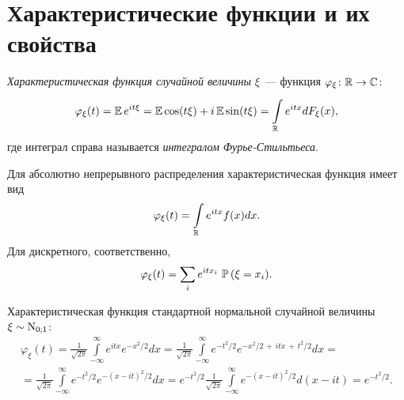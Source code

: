 \section{Характеристические функции и их свойства}
\begin{defn}
    \textit{Характеристическая функция случайной величины} $\xi$~--- функция $\varphi_{\xi} \colon \mathbb{R} \to \mathbb{C}$:
    \begin{equation*}
        \varphi_{\xi}(t)
        = \operatorname{\mathbb{E}} e^{it \xi}
        = \operatorname{\mathbb{E}} \cos (t \xi)+i \operatorname{\mathbb{E}} \sin (t \xi) = \int\limits_{\mathbb{R}}^{} e^{i t x} d F_{\xi}(x),
    \end{equation*}
    где интеграл справа называется \textit{интегралом Фурье-Стильтьеса}.
    
    Для абсолютно непрерывного распределения характеристическая функция имеет вид
    \begin{equation*}
        \varphi_{\xi}(t)=\int\limits_{\mathbb{R}} e^{i t x} f(x) dx.
    \end{equation*}
    Для дискретного, соответственно,
    \begin{equation*}
        \varphi_{\xi}(t)=\sum\limits_{i} e^{i t x_{i}} \, \operatorname{\mathbb{P}}\left(\xi=x_{i}\right) \! .
    \end{equation*}
\end{defn}

\begin{exmp}
    Характеристическая функция стандартной нормальной случайной величины $\xi \sim \operatorname{\mathrm{N}}_{0;1}$:
    \begin{multline*}
        \varphi_{\xi}(t) 
        = \frac{1}{\sqrt{2 \pi}} \int\limits_{-\infty}^{\infty} e^{i t x} e^{-x^{2} / 2} d x
        = \frac{1}{\sqrt{2 \pi}} \int\limits_{-\infty}^{\infty} e^{-t^{2} / 2} e^{-x^2/2 \,+\, itx \,+\, t^2/2} d x = \\
        = \frac{1}{\sqrt{2 \pi}} \int\limits_{-\infty}^{\infty} e^{-t^{2} / 2} e^{-(x-i t)^{2} / 2} d x =
         e^{-t^{2} / 2} \frac{1}{\sqrt{2 \pi}} \int\limits_{-\infty}^{\infty} e^{-(x-i t)^{2} / 2} d(x-i t)
        = e^{-t^{2} / 2}.
    \end{multline*}
\end{exmp}

